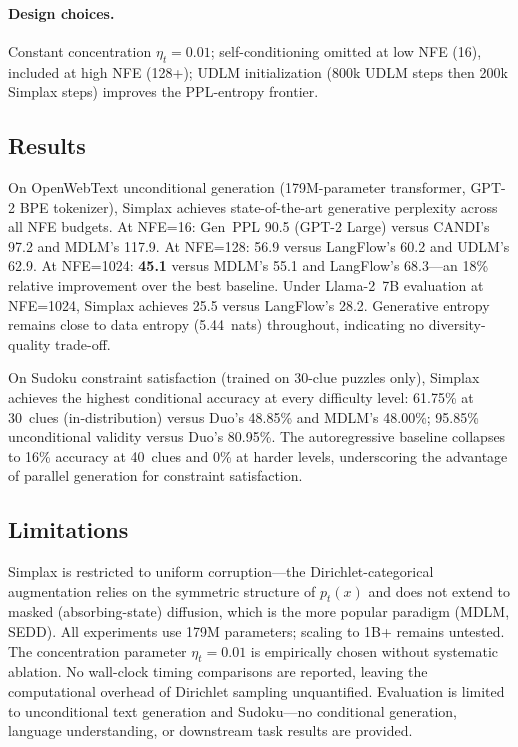 \documentclass[11pt,a4paper]{article}
\begin{document}
\paragraph{Design choices.} Constant concentration $\eta_t = 0.01$; self-conditioning omitted at low NFE (16), included at high NFE (128+); UDLM initialization (800k UDLM steps then 200k Simplax steps) improves the PPL-entropy frontier.

\subsection{Results}

On OpenWebText unconditional generation (179M-parameter transformer, GPT-2 BPE tokenizer), Simplax achieves state-of-the-art generative perplexity across all NFE budgets. At NFE=16: Gen~PPL 90.5 (GPT-2 Large) versus CANDI's 97.2 and MDLM's 117.9. At NFE=128: 56.9 versus LangFlow's 60.2 and UDLM's 62.9. At NFE=1024: \textbf{45.1} versus MDLM's 55.1 and LangFlow's 68.3---an 18\% relative improvement over the best baseline. Under Llama-2~7B evaluation at NFE=1024, Simplax achieves 25.5 versus LangFlow's 28.2. Generative entropy remains close to data entropy (5.44~nats) throughout, indicating no diversity-quality trade-off.

On Sudoku constraint satisfaction (trained on 30-clue puzzles only), Simplax achieves the highest conditional accuracy at every difficulty level: 61.75\% at 30~clues (in-distribution) versus Duo's 48.85\% and MDLM's 48.00\%; 95.85\% unconditional validity versus Duo's 80.95\%. The autoregressive baseline collapses to 16\% accuracy at 40~clues and 0\% at harder levels, underscoring the advantage of parallel generation for constraint satisfaction.

\subsection{Limitations}

Simplax is restricted to uniform corruption---the Dirichlet-categorical augmentation relies on the symmetric structure of $p_t(x)$ and does not extend to masked (absorbing-state) diffusion, which is the more popular paradigm (MDLM, SEDD). All experiments use 179M parameters; scaling to 1B+ remains untested. The concentration parameter $\eta_t = 0.01$ is empirically chosen without systematic ablation. No wall-clock timing comparisons are reported, leaving the computational overhead of Dirichlet sampling unquantified. Evaluation is limited to unconditional text generation and Sudoku---no conditional generation, language understanding, or downstream task results are provided.
\end{document}
